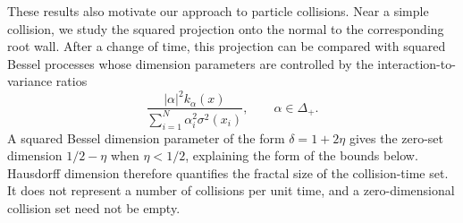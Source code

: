 \documentclass{article}
\numberwithin{equation}{section}
\newcommand{\SimplePlus}{\Delta_+}
\theoremstyle{plain}
\begin{document}
These results also motivate our approach to particle
collisions. Near a simple collision, we study the squared projection onto the normal to the corresponding root wall. After a change of time, this projection can be compared with squared Bessel processes whose dimension parameters are controlled by the interaction-to-variance ratios
\begin{equation*}
    \frac{|\alpha|^2k_\alpha(x)}
         {\sum_{i=1}^N\alpha_i^2\sigma^2(x_i)},
    \qquad \alpha\in\SimplePlus.
\end{equation*}
A squared Bessel dimension parameter of the form $\delta=1+2\eta$ gives the zero-set dimension
$1/2-\eta$ when $\eta<1/2$, explaining the form of the bounds below. Hausdorff dimension therefore quantifies the fractal size of the collision-time set. It does not represent a number of collisions per unit time, and a zero-dimensional collision set need not be empty.
\end{document}
